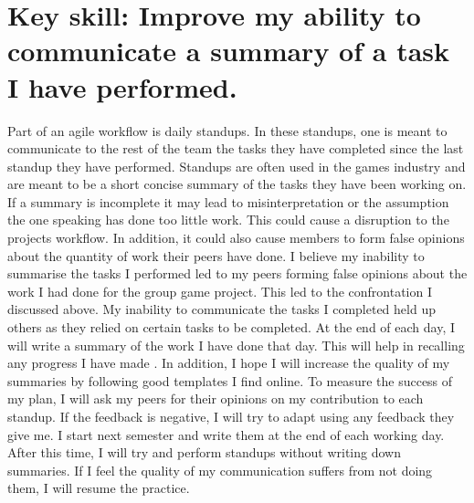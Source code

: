 \documentclass{scrartcl}
\begin{document}
\section{Key skill: Improve my ability to communicate a summary of a task I have performed.}
Part of an agile workflow is daily standups. In these standups, one is meant to communicate to the rest of the team the tasks they have completed since the last standup they have performed. Standups are often used in the games industry and are meant to be a short concise summary of the tasks they have been working on. If a summary is incomplete it may lead to misinterpretation or the assumption the one speaking has done too little work. This could cause a disruption to the projects workflow. In addition, it could also cause members to form false opinions about the quantity of work their peers have done. I believe my inability to summarise the tasks I performed led to my peers forming false opinions about the work I had done for the group game project. This led to the confrontation I discussed above. My inability to communicate the tasks I completed held up others as they relied on certain tasks to be completed. At the end of each day, I will write a summary of the work I have done that day. This will help in recalling any progress I have made . In addition, I hope I will increase the quality of my summaries by following good templates I find online. To measure the success of my plan, I will ask my peers for their opinions on my contribution to each standup. If the feedback is negative, I will try to adapt using any feedback they give me. I start next semester and write them at the end of each working day. After this time, I will try and perform standups without writing down summaries. If I feel the quality of my communication suffers from not doing them, I will resume the practice. 
\end{document}
